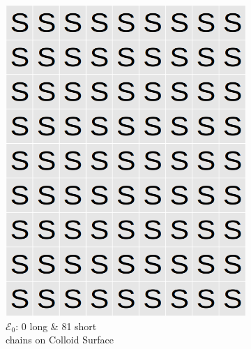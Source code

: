 \documentclass[journal=mamobx,manuscript=article]{achemso}
\begin{document}
\begin{figure}[H]
    \begin{subfigure}[b]{0.4\textwidth}
        \includegraphics[scale=0.15]{fig8a.png}
        \caption{ $\mathcal{E}_0$:  0 long \& 81 short \\chains on Colloid Surface}
        \label{fig:A}
    \end{subfigure}
    \begin{subfigure}[b]{0.4\textwidth}

\end{subfigure}
\end{figure}
\end{document}
